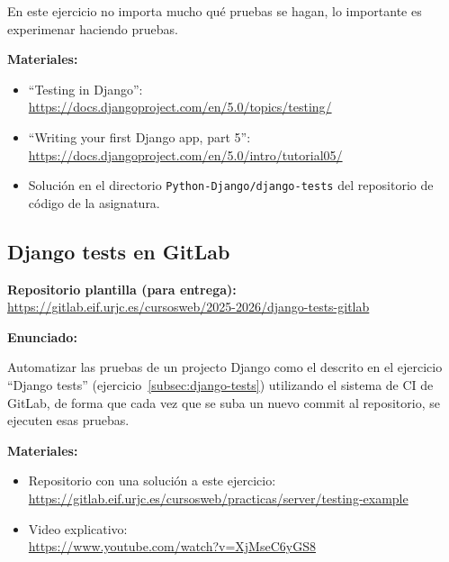 En este ejercicio no importa mucho qué pruebas se hagan, lo importante es experimenar haciendo pruebas.

\textbf{Materiales:}

\begin{itemize}
\item ``Testing in Django'': \\
  \url{https://docs.djangoproject.com/en/5.0/topics/testing/}

\item ``Writing your first Django app, part 5'': \\
\url{https://docs.djangoproject.com/en/5.0/intro/tutorial05/}

\item Solución en el directorio \texttt{Python-Django/django-tests} del repositorio de código de la asignatura.

\end{itemize}

\subsection{Django tests en GitLab}
\label{subsec:django-tests-gitlab}

\textbf{Repositorio plantilla (para entrega):} \\
\url{https://gitlab.eif.urjc.es/cursosweb/2025-2026/django-tests-gitlab}

\textbf{Enunciado:}

Automatizar las pruebas de un projecto Django como el descrito en el ejercicio ``Django tests'' (ejercicio~\ref{subsec:django-tests}) utilizando el sistema de CI de GitLab, de forma que cada vez que se suba un nuevo commit al repositorio, se ejecuten esas pruebas.


\textbf{Materiales:}

\begin{itemize}
\item Repositorio con una solución a este ejercicio: \\
  \url{https://gitlab.eif.urjc.es/cursosweb/practicas/server/testing-example}
\item Video explicativo: \\
  \url{https://www.youtube.com/watch?v=XjMseC6yGS8}
\end{itemize}


